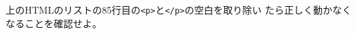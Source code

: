 \begin{Prob}\upshape\Must
上のHTMLのリストの85行目の\texttt{<p>}と\texttt{</p>}の空白を取り除い
 たら正しく動かなくなることを確認せよ。
\end{Prob}
